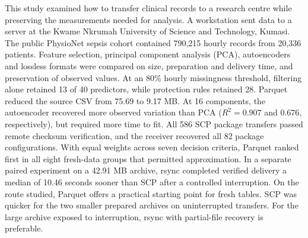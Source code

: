 \abstract
\begin{singlespace}
\noindent This study examined how to transfer clinical records to a research centre while preserving the measurements needed for analysis. A workstation sent data to a server at the Kwame Nkrumah University of Science and Technology, Kumasi. The public PhysioNet sepsis cohort contained 790,215 hourly records from 20,336 patients. Feature selection, principal component analysis (PCA), autoencoders and lossless formats were compared on size, preparation and delivery time, and preservation of observed values. At an 80\% hourly missingness threshold, filtering alone retained 13 of 40 predictors, while protection rules retained 28. Parquet reduced the source CSV from 75.69 to 9.17 MB. At 16 components, the autoencoder recovered more observed variation than PCA (\(R^2=0.907\) and \(0.676\), respectively), but required more time to fit. All 586 SCP package transfers passed remote checksum verification, and the receiver recovered all 82 package configurations. With equal weights across seven decision criteria, Parquet ranked first in all eight fresh-data groups that permitted approximation. In a separate paired experiment on a 42.91 MB archive, rsync completed verified delivery a median of 10.46 seconds sooner than SCP after a controlled interruption. On the route studied, Parquet offers a practical starting point for fresh tables. SCP was quicker for the two smaller prepared archives on uninterrupted transfers. For the large archive exposed to interruption, rsync with partial-file recovery is preferable.
\end{singlespace}
